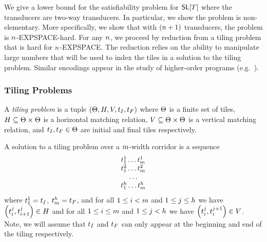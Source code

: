 
We give a lower bound for the satisfiability problem for $\mathsf{SL}[T]$ where the transducers are two-way transducers.
In particular, we show the problem is non-elementary.
More specifically, we show that with $(n+1)$ transducers, the problem is $n$-EXPSPACE-hard.
For any $n$, we proceed by reduction from a tiling problem that is hard for $n$-EXPSPACE.
The reduction relies on the ability to manipulate large numbers that will be used to index the tiles in a solution to the tiling problem.
Similar encodings appear in the study of higher-order programs (e.g.~\cite{J01,CW07}).

\subsubsection{Tiling Problems}

\begin{definition}
    A \emph{tiling problem} is a tuple
    $\left( \Theta, H, V, t_I, t_F \right)$
    where
        $\Theta$ is a finite set of tiles,
        $H \subseteq \Theta \times \Theta$ is a horizontal matching relation,
        $V \subseteq \Theta \times \Theta$ is a vertical matching relation, and
        $t_I, t_F \in \Theta$ are initial and final tiles respectively.
\end{definition}

A solution to a tiling problem over a $m$-width corridor is a sequence
\[
    \begin{array}{c}
        t^1_1 \ldots t^1_m \\
        t^2_1 \ldots t^2_m \\
        \ldots \\
        t^h_1 \ldots t^h_m
    \end{array}
\]
where
$t^1_1 = t_I$,
$t^h_m = t_F$,
and for all
$1 \leq i < m$
and
$1 \leq j \leq h$
we have
$\left( t^j_i, t^j_{i+1} \right) \in H$
and for all
$1 \leq i \leq m$
and
$1 \leq j < h$
we have
$\left( t^j_i, t^{j+1}_i \right) \in V$.
Note, we will assume that $t_I$ and $t_F$ can only appear at the beginning and end of the tiling respectively.

